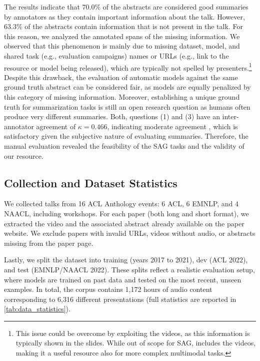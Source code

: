 The results indicate that $70.0\%$ of the abstracts are considered good summaries by annotators as they contain important information about the talk. 
However, $63.3\%$ of the abstracts contain  information that is not present in the talk.
For this reason, we analyzed the annotated spans of the missing information. We observed that this phenomenon is mainly due to missing dataset, model, and shared task (e.g., evaluation campaigns) names or URLs (e.g., link to the resource or model being released), 
which are typically not spelled by  presenters.\footnote{This issue could be  overcome by exploiting the videos, as this information is typically shown in the slides. While out of scope for SAG, \DATASETNAME{} includes the videos, making it a useful resource also for more complex multimodal tasks.}
Despite this drawback, the evaluation of automatic models against the same ground truth abstract can be considered fair, as models are equally penalized by this category of missing information. Moreover, establishing a unique ground truth for summarization tasks is still an open research question  \citep{zhang-etal-2024-benchmarking} as humans often produce very different summaries. Both, questions (1) and (3) have an inter-annotator agreement of $\kappa=0.466$, indicating moderate agreement \citep{IAA-agreement}, which is satisfactory given the subjective nature of evaluating summaries. Therefore, the manual evaluation revealed the feasibility of the 
SAG tasks and the validity of our resource.

\subsection{Collection and Dataset
Statistics}
\label{subsec:collection}
We collected talks from 16 ACL Anthology events: 6 ACL, 6 EMNLP, and 4 NAACL, including workshops.
For each paper (both long and short format), we extracted the video and the associated abstract already available on the paper website. We exclude papers with invalid URLs, videos without audio, or abstracts missing from the paper page.

Lastly, we split the dataset into training (years  2017 to 2021), dev (ACL 2022), and test (EMNLP/NAACL 2022).
These splits reflect a realistic evaluation setup, where models are trained on past data and tested on the most recent, unseen examples.
In total, the corpus contains 1,172 hours of audio content corresponding to 6,316 different presentations (full statistics are reported in \cref{tab:data_statistics}).

